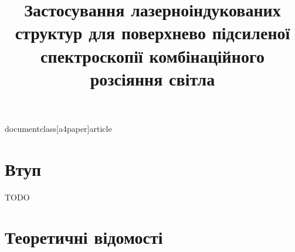 documentclass[a4paper]{article}

\usepackage[english, ukrainian]{babel}
\usepackage[utf8x]{inputenc}
\usepackage{amsmath}
\usepackage{graphicx}
\usepackage[colorinlistoftodos]{todonotes}


    \title{Застосування лазерноіндукованих структур для поверхнево підсиленої спектроскопії комбінаційного розсіяння світла}
    \maketitle
    \section{Втуп}
        TODO
    \section{Теоретичні відомості}
